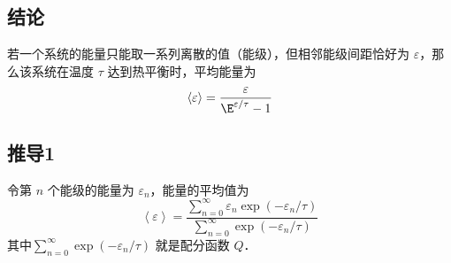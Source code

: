 

\subsection{结论}
若一个系统的能量只能取一系列离散的值（能级），但相邻能级间距恰好为 $\varepsilon$，那么该系统在温度 $\tau$ 达到热平衡时，平均能量为
\begin{equation}
\left\langle \varepsilon  \right\rangle  = \frac{\varepsilon }{{{\E^{\varepsilon /\tau }} - 1}}
\end{equation}

\subsection{推导1}
令第 $n$ 个能级的能量为 ${\varepsilon _n}$，能量的平均值为
\begin{equation}\label{EqCE_eq2}
\left\langle \varepsilon  \right\rangle  = \frac{{\sum\limits_{n = 0}^\infty  {{\varepsilon _n}\exp \left( { - {\varepsilon _n}/\tau } \right)} }}{{\sum\limits_{n = 0}^\infty  {\exp \left( { - {\varepsilon _n}/\tau } \right)} }}
\end{equation}
其中$\sum\limits_{n = 0}^\infty  {\exp \left( { - {\varepsilon _n}/\tau } \right)}$ 就是配分函数 $Q$．

